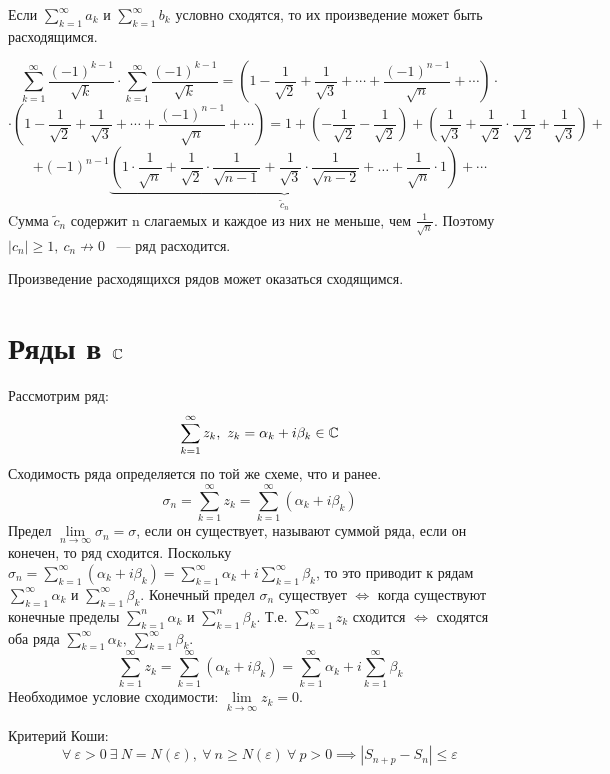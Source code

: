 \documentclass[../../main.tex]{subfiles}
\begin{document}
Если $\sum\limits_{k = 1}^{\infty} a_k$ и
$\sum\limits_{k = 1}^{\infty} b_k$ условно сходятся, то их произведение
может быть расходящимся.
\begin{example}
	\[\sum\limits_{k = 1}^{\infty} \frac{(-1)^{k-1}}{\sqrt{k}} \cdot
	\sum\limits_{k = 1}^{\infty} \frac{(-1)^{k-1}}{\sqrt{k}} =
	\left(1 - \frac{1}{\sqrt{2}} + \frac{1}{\sqrt{3}} + \cdots +
	\frac{(-1)^{n-1}}{\sqrt{n}} + \cdots \right) \cdot \]
	\[\cdot \left(1 - \frac{1}{\sqrt{2}} + \frac{1}{\sqrt{3}} + \cdots +
	\frac{(-1)^{n-1}}{\sqrt{n}} + \cdots \right) = 1 +
	\left( - \frac{1}{\sqrt{2}} - \frac{1}{\sqrt{2}} \right) +
	\left( \frac{1}{\sqrt{3}} + \frac{1}{\sqrt{2}} \cdot
	\frac{1}{\sqrt{2}} + \frac{1}{\sqrt{3}} \right) + \] 
	\[ + \left( -1 \right) ^ {n - 1}
	\underbrace{\left(1 \cdot \frac{1}{\sqrt{n}} + \frac{1}{\sqrt{2}} \cdot
	\frac{1}{\sqrt{n - 1}} + \frac{1}{\sqrt{3}} \cdot
	\frac{1}{\sqrt{n - 2}} + \ldots + \frac{1}{\sqrt{n}}
	\cdot 1\right)}_{\tilde{c}_n} + \cdots \]
	Cумма $\tilde{c}_n$ содержит n слагаемых и каждое из них не меньше,
	чем $\frac{1}{\sqrt{n}}$. Поэтому $|c_n| \geq 1, \ c_n \not\to 0$
	~--- ряд расходится.
\end{example}
\begin{remark}
	Произведение расходящихся рядов может оказаться сходящимся.
\end{remark}
\section{Ряды в $\mathbb{C}$}
Рассмотрим ряд:
\[\sum\limits_{k = 1}^{\infty} z_k , \ z_k =
\alpha_k + i\beta_k \in \mathbb{C}\]
Сходимость ряда определяется по той же схеме, что и ранее.
\[ \sigma_n = \sum\limits_{k = 1}^{\infty} z_k =
\sum\limits_{k = 1}^{\infty} (\alpha_k + i\beta_k)\]
Предел $\lim\limits_{n \to \infty} \sigma_n = \sigma$,
если он существует, называют суммой ряда, если он конечен, то ряд сходится.
Поскольку $\sigma_n = \sum\limits_{k = 1}^{\infty} (\alpha_k + i\beta_k) =
\sum\limits_{k = 1}^{\infty} \alpha_k +
i \sum\limits_{k = 1}^{\infty} \beta_k$,
то это приводит к рядам $\sum\limits_{k = 1}^{\infty} \alpha_k$ и
$\sum\limits_{k = 1}^{\infty} \beta_k$.
Конечный предел $\sigma_n$ существует $\iff$ когда
существуют конечные пределы $\sum\limits_{k = 1}^{n} \alpha_k$ и
$\sum\limits_{k = 1}^{n} \beta_k$.
Т.е. $\sum\limits_{k = 1}^{\infty} z_k$ сходится $\iff$
сходятся оба ряда $\sum\limits_{k = 1}^{\infty} \alpha_k , \
\sum\limits_{k = 1}^{\infty} \beta_k$.
\[\sum\limits_{k = 1}^{\infty} z_k = \sum\limits_{k = 1}^{\infty}
(\alpha_k + i\beta_k) = \sum\limits_{k = 1}^{\infty} \alpha_k +
i\sum\limits_{k = 1}^{\infty} \beta_k\]
Необходимое условие сходимости: $\lim\limits_{k \to \infty} z_k = 0$.

Критерий Коши:
\[ \forall \ \varepsilon > 0 \ \exists \ N = N(\varepsilon), \ \forall \
n \geq N(\varepsilon) \ \forall \ p > 0 \implies
|S_{n + p} - S_n| \leq \varepsilon \]
\end{document}
